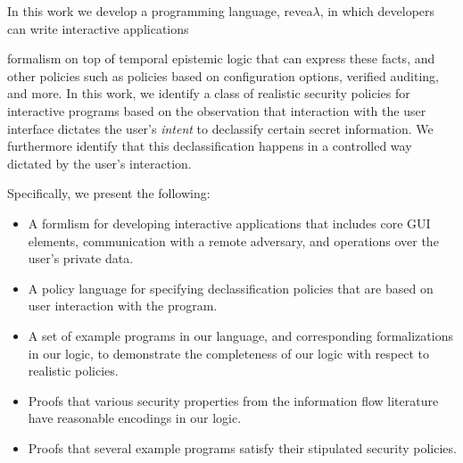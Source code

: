\documentclass[conference]{IEEEtran}
\theoremstyle{definition}
\newcommand{\comment}[3][\color{red}]{{#1{[{#2}: {#3}]}}}
\newcommand{\kris}[1]{\comment[\color{orange}]{kris}{#1}}
\newcommand{\lang}{revea$\lambda$\xspace}
\begin{document}
In this work we develop a programming language, \lang, in which 
developers can write interactive applications 

formalism on top of temporal epistemic logic that can
express these facts, and other policies such as policies based on
configuration options, verified auditing, and more.  In this work, we
identify a class of realistic security policies for interactive
programs based on the observation that interaction with the user
interface dictates the user's \emph{intent} to declassify certain
secret information.  We furthermore identify that this
declassification happens in a controlled way dictated by the user's
interaction. \kris{also repetitive...}

Specifically, we present the following:

\begin{itemize}
\item A formlism for developing interactive applications that includes
  core GUI elements, communication with a remote adversary, and
  operations over the user's private data.

\item A policy language for specifying declassification policies that
  are based on user interaction with the program.

\item A set of example programs in our language, and corresponding
  formalizations in our logic, to demonstrate the completeness of our
  logic with respect to realistic policies.

\item Proofs that various security properties from the information
  flow literature have reasonable encodings in our logic.

\item Proofs that several example programs satisfy their stipulated
  security policies.

\end{itemize}

\end{document}
